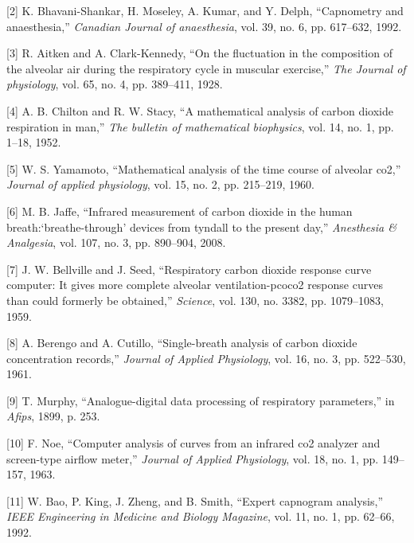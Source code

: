 \documentclass[12pt,]{article}
\begin{document}
\hypertarget{ref-bhavani1992capnometry}{}
{[}2{]} K. Bhavani-Shankar, H. Moseley, A. Kumar, and Y. Delph,
``Capnometry and anaesthesia,'' \emph{Canadian Journal of anaesthesia},
vol. 39, no. 6, pp. 617--632, 1992.

\hypertarget{ref-aitken1928fluctuation}{}
{[}3{]} R. Aitken and A. Clark-Kennedy, ``On the fluctuation in the
composition of the alveolar air during the respiratory cycle in muscular
exercise,'' \emph{The Journal of physiology}, vol. 65, no. 4, pp.
389--411, 1928.

\hypertarget{ref-chilton1952mathematical}{}
{[}4{]} A. B. Chilton and R. W. Stacy, ``A mathematical analysis of
carbon dioxide respiration in man,'' \emph{The bulletin of mathematical
biophysics}, vol. 14, no. 1, pp. 1--18, 1952.

\hypertarget{ref-yamamoto1960mathematical}{}
{[}5{]} W. S. Yamamoto, ``Mathematical analysis of the time course of
alveolar co2,'' \emph{Journal of applied physiology}, vol. 15, no. 2,
pp. 215--219, 1960.

\hypertarget{ref-jaffe2008infrared}{}
{[}6{]} M. B. Jaffe, ``Infrared measurement of carbon dioxide in the
human breath:`breathe-through' devices from tyndall to the present
day,'' \emph{Anesthesia \& Analgesia}, vol. 107, no. 3, pp. 890--904,
2008.

\hypertarget{ref-bellville1959respiratory}{}
{[}7{]} J. W. Bellville and J. Seed, ``Respiratory carbon dioxide
response curve computer: It gives more complete alveolar
ventilation-pcoco2 response curves than could formerly be obtained,''
\emph{Science}, vol. 130, no. 3382, pp. 1079--1083, 1959.

\hypertarget{ref-berengo1961single}{}
{[}8{]} A. Berengo and A. Cutillo, ``Single-breath analysis of carbon
dioxide concentration records,'' \emph{Journal of Applied Physiology},
vol. 16, no. 3, pp. 522--530, 1961.

\hypertarget{ref-murphy1899analogue}{}
{[}9{]} T. Murphy, ``Analogue-digital data processing of respiratory
parameters,'' in \emph{Afips}, 1899, p. 253.

\hypertarget{ref-noe1963computer}{}
{[}10{]} F. Noe, ``Computer analysis of curves from an infrared co2
analyzer and screen-type airflow meter,'' \emph{Journal of Applied
Physiology}, vol. 18, no. 1, pp. 149--157, 1963.

\hypertarget{ref-bao1992expert}{}
{[}11{]} W. Bao, P. King, J. Zheng, and B. Smith, ``Expert capnogram
analysis,'' \emph{IEEE Engineering in Medicine and Biology Magazine},
vol. 11, no. 1, pp. 62--66, 1992.
\end{document}
